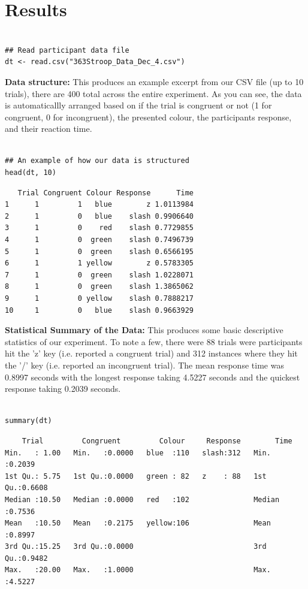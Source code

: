 \documentclass{article}
\begin{document}
\section{Results}
\label{sec:org7cf09a1}

\begin{verbatim}

## Read participant data file
dt <- read.csv("363Stroop_Data_Dec_4.csv")

\end{verbatim}

\textbf{Data structure:} This produces an example excerpt from our CSV file (up to 10 trials), there are 400 total across the entire experiment. As you can see, the data is automaticallly arranged based on if the trial is congruent or not (1 for congruent, 0 for incongruent), the presented colour, the participants response, and their reaction time.
\begin{verbatim}

## An example of how our data is structured
head(dt, 10)
\end{verbatim}

\begin{verbatim}
   Trial Congruent Colour Response      Time
1      1         1   blue        z 1.0113984
2      1         0   blue    slash 0.9906640
3      1         0    red    slash 0.7729855
4      1         0  green    slash 0.7496739
5      1         0  green    slash 0.6566195
6      1         1 yellow        z 0.5783305
7      1         0  green    slash 1.0228071
8      1         0  green    slash 1.3865062
9      1         0 yellow    slash 0.7888217
10     1         0   blue    slash 0.9663929
\end{verbatim}

\vspace{2em} \textbf{Statistical Summary of the Data:} This produces some basic descriptive statistics of our experiment. To note a few, there were 88 trials were participants hit the 'z' key (i.e. reported a congruent trial) and 312 instances where they hit the '/' key (i.e. reported an incongruent trial). The mean response time was 0.8997 seconds with the longest response taking 4.5227 seconds and the quickest response taking 0.2039 seconds. 
\begin{verbatim}

summary(dt)

\end{verbatim}

\begin{verbatim}
    Trial         Congruent         Colour     Response        Time       
Min.   : 1.00   Min.   :0.0000   blue  :110   slash:312   Min.   :0.2039  
1st Qu.: 5.75   1st Qu.:0.0000   green : 82   z    : 88   1st Qu.:0.6608  
Median :10.50   Median :0.0000   red   :102               Median :0.7536  
Mean   :10.50   Mean   :0.2175   yellow:106               Mean   :0.8997  
3rd Qu.:15.25   3rd Qu.:0.0000                            3rd Qu.:0.9482  
Max.   :20.00   Max.   :1.0000                            Max.   :4.5227
\end{verbatim}
\end{document}
